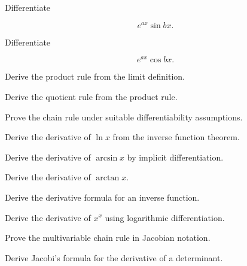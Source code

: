 \begin{exercise}[3]
Differentiate

\[
e^{ax}\sin bx.
\]
\end{exercise}

\begin{exercise}[3]
Differentiate

\[
e^{ax}\cos bx.
\]
\end{exercise}

\begin{exercise}[4]
Derive the product rule from the limit definition.
\end{exercise}

\begin{exercise}[4]
Derive the quotient rule from the product rule.
\end{exercise}

\begin{exercise}[4]
Prove the chain rule under suitable differentiability assumptions.
\end{exercise}

\begin{exercise}[4]
Derive the derivative of \(\ln x\) from the inverse function theorem.
\end{exercise}

\begin{exercise}[4]
Derive the derivative of \(\arcsin x\) by implicit differentiation.
\end{exercise}

\begin{exercise}[4]
Derive the derivative of \(\arctan x\).
\end{exercise}

\begin{exercise}[4]
Derive the derivative formula for an inverse function.
\end{exercise}

\begin{exercise}[4]
Derive the derivative of \(x^x\) using logarithmic differentiation.
\end{exercise}

\begin{exercise}[4]
Prove the multivariable chain rule in Jacobian notation.
\end{exercise}

\begin{exercise}[4]
Derive Jacobi's formula for the derivative of a determinant.
\end{exercise}

